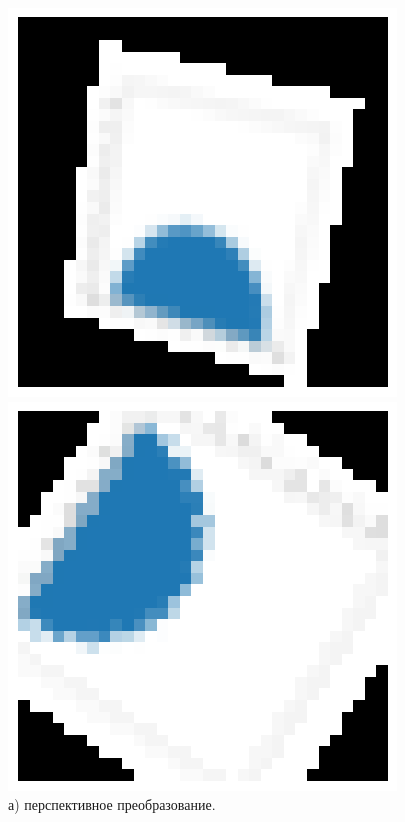 \documentclass[14pt, russian]{scrartcl}
\begin{document}
\begin{figure}[H]
	\centering
	\begin{minipage}[t]{.3\textwidth}
		\centering
		\includegraphics[width=\linewidth]{./img/perspec.png}
		\caption*{а) перспективное преобразование.}
	\end{minipage}
	\noindent
	\begin{minipage}[t]{.3\textwidth}
		\centering
		\includegraphics[width=\linewidth]{./img/rotate.png}

\end{minipage}
\end{figure}
\end{document}
